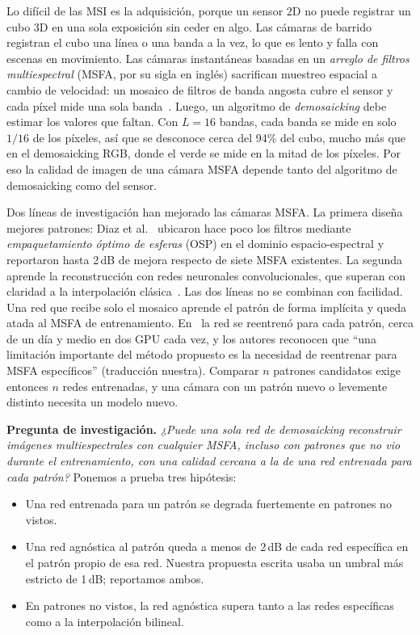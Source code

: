 \documentclass{article}
\begin{document}
Lo difícil de las MSI es la adquisición, porque un sensor 2D no puede
registrar un cubo 3D en una sola exposición sin ceder en algo. Las cámaras
de barrido registran el cubo una línea o una banda a la vez, lo que es lento
y falla con escenas en movimiento. Las cámaras instantáneas basadas en un
\emph{arreglo de filtros multiespectral} (MSFA, por su sigla en inglés)
sacrifican muestreo espacial a cambio de velocidad: un mosaico de filtros de
banda angosta cubre el sensor y cada píxel mide una sola
banda~\cite{lapray2014,geelen2014}. Luego, un algoritmo de
\emph{demosaicking} debe estimar los valores que faltan. Con $L=16$ bandas,
cada banda se mide en solo $1/16$ de los píxeles, así que se desconoce cerca
del 94\% del cubo, mucho más que en el demosaicking RGB, donde el verde se
mide en la mitad de los píxeles. Por eso la calidad de imagen de una cámara
MSFA depende tanto del algoritmo de demosaicking como del sensor.

Dos líneas de investigación han mejorado las cámaras MSFA. La primera
diseña mejores patrones: Diaz et al.~\cite{diaz2023} ubicaron hace poco los
filtros mediante \emph{empaquetamiento óptimo de esferas} (OSP) en el
dominio espacio-espectral y reportaron hasta 2\,dB de mejora respecto de
siete MSFA existentes. La segunda aprende la reconstrucción con redes
neuronales convolucionales, que superan con claridad a la interpolación
clásica~\cite{feng2021,diaz2023}. Las dos líneas no se combinan con
facilidad. Una red que recibe solo el mosaico aprende el patrón de forma
implícita y queda atada al MSFA de entrenamiento. En~\cite{diaz2023} la red
se reentrenó para cada patrón, cerca de un día y medio en dos GPU cada vez,
y los autores reconocen que ``una limitación importante del método propuesto
es la necesidad de reentrenar para MSFA específicos'' (traducción nuestra).
Comparar $n$ patrones candidatos exige entonces $n$ redes entrenadas, y una
cámara con un patrón nuevo o levemente distinto necesita un modelo nuevo.

\textbf{Pregunta de investigación.} \emph{¿Puede una sola red de
demosaicking reconstruir imágenes multiespectrales con cualquier MSFA,
incluso con patrones que no vio durante el entrenamiento, con una calidad
cercana a la de una red entrenada para cada patrón?} Ponemos a prueba tres
hipótesis:
\begin{itemize}
  \item[\textbf{H1}] Una red entrenada para un patrón se degrada
        fuertemente en patrones no vistos.
  \item[\textbf{H2}] Una red agnóstica al patrón queda a menos de 2\,dB de
        cada red específica en el patrón propio de esa red. Nuestra
        propuesta escrita usaba un umbral más estricto de 1\,dB; reportamos
        ambos.
  \item[\textbf{H3}] En patrones no vistos, la red agnóstica supera tanto a
        las redes específicas como a la interpolación bilineal.
\end{itemize}
\end{document}

